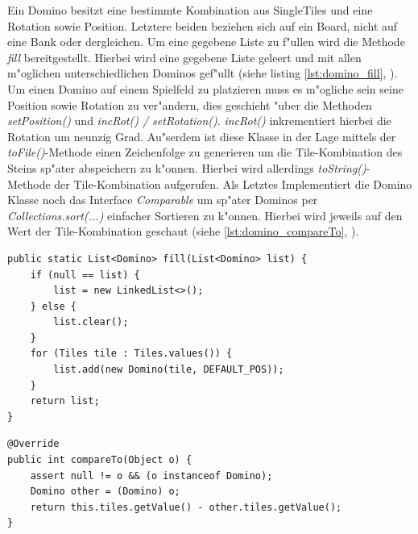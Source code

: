 Ein Domino besitzt eine bestimmte Kombination aus SingleTiles und eine Rotation sowie Position. Letztere beiden beziehen sich auf ein Board, nicht auf eine Bank oder dergleichen. Um eine gegebene Liste zu f"ullen wird die Methode \emph{fill} bereitgestellt. Hierbei wird eine gegebene Liste geleert und mit allen m"oglichen unterschiedlichen Dominos gef"ullt (siehe listing \ref{lst:domino_fill}, ). Um einen Domino auf einem Spielfeld zu platzieren muss es m"ogliche sein seine Position sowie Rotation zu ver"andern, dies geschieht "uber die Methoden \emph{setPosition()} und \emph{incRot() / setRotation()}. \emph{incRot()} inkrementiert hierbei die Rotation um neunzig Grad. Au"serdem ist diese Klasse in der Lage mittels der \emph{toFile()}-Methode einen Zeichenfolge zu generieren um die Tile-Kombination des Steins sp"ater abspeichern zu k"onnen. Hierbei wird allerdings \emph{toString()}-Methode der Tile-Kombination aufgerufen. Als Letztes Implementiert die Domino Klasse noch das Interface \emph{Comparable} um sp"ater Dominos per \emph{Collections.sort(...)} einfacher Sortieren zu k"onnen. Hierbei wird jeweils auf den Wert der Tile-Kombination geschaut (siehe \ref{lst:domino_compareTo}, ). 

\begin{lstlisting}[float,style=CodeHighlighting,caption=Domino - fill,label=lst:domino_fill]
public static List<Domino> fill(List<Domino> list) {
    if (null == list) {
        list = new LinkedList<>();
    } else {
        list.clear();
    }
    for (Tiles tile : Tiles.values()) {
        list.add(new Domino(tile, DEFAULT_POS));
    }
    return list;
}
\end{lstlisting}

\begin{lstlisting}[float,style=CodeHighlighting,caption=Domino - compareTo,label=lst:domino_compareTo]
@Override
public int compareTo(Object o) {
    assert null != o && (o instanceof Domino);
    Domino other = (Domino) o;
    return this.tiles.getValue() - other.tiles.getValue();
}
\end{lstlisting}